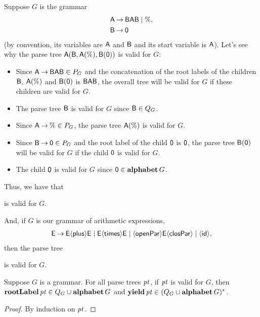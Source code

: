 Suppose $G$ is the grammar
\begin{align*}
\mathsf{A} &\mathbin{\to} \mathsf{B}\mathsf{A}\mathsf{B} \mid \% , \\
\mathsf{B} &\mathbin{\to} \mathsf{0} 
\end{align*}
(by convention, its variables are $\mathsf{A}$ and $\mathsf{B}$ and its
start variable is $\mathsf{A}$).
Let's see why the parse tree $\mathsf{A}(\mathsf{B},\mathsf{A}(\%),\mathsf{B}(\mathsf{0}))$ is
valid for $G$:
\begin{itemize}
\item Since $\mathsf{A}\mathbin{\to}\mathsf{B}\mathsf{A}\mathsf{B}\in P_G$ and the concatenation
of the root labels of the children
$\mathsf{B}$, $\mathsf{A}(\%)$ and $\mathsf{B}(\mathsf{0})$ is $\mathsf{B}\mathsf{A}\mathsf{B}$,
the overall tree will be valid for $G$ if these children are valid
for $G$.

\item The parse tree $\mathsf{B}$ is valid for $G$
since $\mathsf{B}\in Q_G$.

\item Since $\mathsf{A}\mathbin{\to}\%\in P_G$, the parse tree
$\mathsf{A}(\%)$ is valid for $G$.

\item Since $\mathsf{B}\mathbin{\to}\mathsf{0}\in P_G$ and the root label of the child
$\mathsf{0}$ is $\mathsf{0}$, the parse tree
$\mathsf{B}(\mathsf{0})$ will be valid for $G$ if the child $\mathsf{0}$
is valid for $G$.

\item The child $\mathsf{0}$ is valid for $G$ since
  $\mathsf{0}\in\mathbf{alphabet}\,G$.
\end{itemize}
Thus, we have that
\begin{center}

\end{center}
is valid for $G$.

And, if $G$ is our grammar of arithmetic expressions,
\begin{gather*}
\mathsf{E\mathbin{\to} E{\langle\mathsf{plus}\rangle} E\mid E{\langle\mathsf{times}\rangle} E\mid {\langle\mathsf{openPar}\rangle} E{\langle\mathsf{closPar}\rangle} \mid
{\langle\mathsf{id}\rangle}} ,
\end{gather*}
then the parse tree
\begin{center}

\end{center}
is valid for $G$.

\begin{proposition}
Suppose $G$ is a grammar. For all parse trees ${\it pt}$, if ${\it pt}$ is valid
for $G$, then $\mathbf{rootLabel}\,{\it pt}\in Q_G\cup\mathbf{alphabet}\,G$ and
$\mathbf{yield}\,{\it pt} \in (Q_G\cup\mathbf{alphabet}\,G)^*$.
\end{proposition}

\begin{proof}
By induction on ${\it pt}$.
\end{proof}

